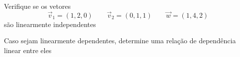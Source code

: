 \documentclass[a4paper,12pt,fleqn]{article}
\begin{document}
%
%
%
%
%
%
%
%
%
%

Verifique se os vetores
\[
  \vec{v}_1=(1,2,0)
  \qquad
  \vec{v}_2=(0,1,1)
  \qquad
  \vec{w}=(1,4,2)
\]
são linearmente independentes

Caso sejam linearmente dependentes, determine uma relação de dependência
linear entre eles
\end{document}
